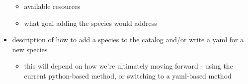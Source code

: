 \documentclass[
  11pt,
]{article}
\providecommand{\tightlist}{%
  \setlength{\itemsep}{0pt}\setlength{\parskip}{0pt}}
\begin{document}
\begin{itemize}
  \begin{itemize}
  \tightlist
  \item
    available resources
  \item
    what goal adding the species would address
  \end{itemize}
\item
  description of how to add a species to the catalog and/or write a yaml
  for a new species

  \begin{itemize}
  \tightlist
  \item
    this will depend on how we're ultimately moving forward - using the
    current python-based method, or switching to a yaml-based method
  \end{itemize}
\end{itemize}
\end{document}
